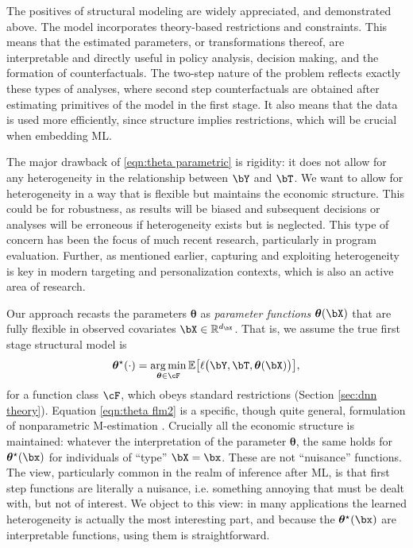 \documentclass[12pt]{article}
\numberwithin{equation}{section}
\theoremstyle{definition}
\DeclareMathOperator*{\argmin}{arg\,min}
\newcommand{\E}{\mathbb{E}}
\newcommand{\R}{\mathbb{R}}
\newcommand{\btheta}{\boldsymbol{\theta}}
\newcommand{\bttrue}{\btheta^\star}
\newcommand{\dx}{d_{\bX}}  %
\begin{document}
The positives of structural modeling are widely appreciated, and demonstrated above. The model incorporates theory-based restrictions and constraints. This means that the estimated parameters, or transformations thereof, are interpretable and directly useful in policy analysis, decision making, and the formation of counterfactuals. The two-step nature of the problem reflects exactly these types of analyses, where second step counterfactuals are obtained after estimating primitives of the model in the first stage. It also means that the data is used more efficiently, since structure implies restrictions, which will be crucial when embedding ML.


The major drawback of \eqref{eqn:theta parametric} is rigidity: it does not allow for any heterogeneity in the relationship between $\bY$ and $\bT$. We want to allow for heterogeneity in a way that is flexible but maintains the economic structure. This could be for robustness, as results will be biased and subsequent decisions or analyses will be erroneous if heterogeneity exists but is neglected. This type of concern has been the focus of much recent research, particularly in program evaluation. Further, as mentioned earlier, capturing and exploiting heterogeneity is key in modern targeting and personalization contexts, which is also an active area of research. 


Our approach recasts the parameters $\btheta$ as \emph{parameter functions} $\btheta(\bX)$ that are fully flexible in observed covariates $\bX \in \R^{\dx}$. That is, we assume the true first stage structural model is 
\begin{equation}
    \label{eqn:theta flm2}
    \bttrue(\cdot) = \argmin_{\btheta \in \cF} \E \big[ \ell\big(\bY,\bT,\btheta(\bX)\big) \big],
\end{equation}
for a function class $\cF$, which obeys standard restrictions (Section \ref{sec:dnn theory}). Equation \eqref{eqn:theta flm2} is a specific, though quite general, formulation of nonparametric M-estimation \cite{Gallant-Nychka1987_Ecma}. Crucially all the economic structure is maintained: whatever the interpretation of the parameter $\btheta$, the same holds for $\bttrue(\bx)$ for individuals of ``type'' $\bX = \bx$. These are not ``nuisance'' functions. The view, particularly common in the realm of inference after ML, is that first step functions are literally a nuisance, i.e. something annoying that must be dealt with, but not of interest. We object to this view: in many applications the learned heterogeneity is actually the most interesting part, and because the $\bttrue(\bx)$ are interpretable functions, using them is straightforward.
\end{document}
